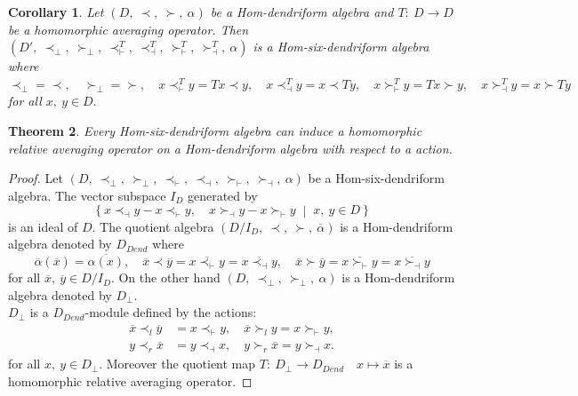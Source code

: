 \documentclass[11pt,twoside,reqno]{amsart}
\theoremstyle{plain}
\newtheorem{thm}{Theorem}[section]
\newtheorem{cor}[thm]{Corollary}
\theoremstyle{definition}
\begin{document}
\begin{cor}
Let $(D ,\ \prec,\  \succ ,\ \alpha)$ be a Hom-dendriform algebra and $T :\ D \to D$ be a homomorphic averaging operator. Then $(D' ,\ \prec_\perp,\  \succ_\perp,\  \prec^{T}_\vdash ,\ \prec^T_\dashv,\  \succ^T_\vdash,\  \succ^T_\dashv,\  \alpha)$ is a Hom-six-dendriform algebra  where \\
$\prec_\perp = \prec ,\quad \succ_\perp = \succ ,\quad 
x \prec^T_\vdash y = T x \prec y ,\quad 
x \prec^T_\dashv y = x \prec T y ,\quad 
x \succ^T_\vdash y = T x \succ y ,\quad
x \succ^T_\dashv y = x \succ T y $\\
for all $x,\ y \in D.$
\end{cor}
\begin{thm}
 Every Hom-six-dendriform algebra can induce a homomorphic relative averaging operator on a Hom-dendriform algebra with respect to a action.    
\end{thm}
\begin{proof}
  Let $(D,\  \prec_{\perp} ,\ \succ_{\perp},\  \prec_\vdash ,\ \prec_\dashv ,\ \succ_\vdash,\  \succ_\dashv,\  \alpha)$ be a Hom-six-dendriform algebra. The vector subspace \(I_D\) generated by
\[
\left\{
x \prec_\dashv y - x \prec_\vdash y  ,\quad
x \succ_\dashv y - x \succ_\vdash y 
\;\middle|\; x,\ y \in D
\right\}
\]
is an ideal of \(D\). The quotient algebra 
$(D / I_D,\  \prec,\   \succ ,\ \overline{\alpha})$
is a Hom-dendriform algebra  denoted by \(D_{Dend}\)  where
\[
\overline{\alpha}(\overline{x}) = \overline{\alpha(x)}  ,\quad
\overline{x} \prec \overline{y} = \overline{x \prec_{\vdash} y} = \overline{x \prec_{\dashv} y}  ,\quad
\overline{x} \succ \overline{y} = \overline{x \succ_{\vdash} y} = \overline{x \succ_{\dashv} y} 
\]
for all $\overline{x} ,\ \overline{y} \in D / I_D.$
On the other hand  \((D  ,\ \prec_{\perp} ,\ \succ_{\perp},\  \alpha)\) is a Hom-dendriform algebra  denoted by \(D_{\perp}\). \\ $D_{\perp}$ is a \(D_{Dend}\)-module defined by the actions:
\begin{align*}
\overline{x} \prec_l \overline{y}& = x \prec_{\vdash} y  ,\quad
\overline{x} \succ_l y = x \succ_{\vdash} y ,\\
y \prec_r \overline{x} &= y \prec_{\dashv} x  ,\quad
y \succ_r \overline{x} = y \succ_{\dashv} x.
\end{align*}
for all \(x,\ y \in D_{\perp}\). Moreover  the quotient map $T :\ D_{\perp} \to D_{Dend}  \quad x \mapsto \overline{x}$  is a homomorphic relative averaging operator.  
\end{proof}
\end{document}
